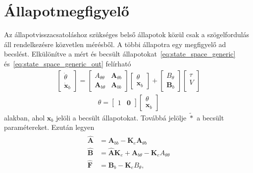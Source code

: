 \section{Állapotmegfigyelő}
Az állapotvisszacsatoláshoz szükséges belső állapotok közül csak a szögelfordulás
áll rendelkezésre közvetlen mérésből. A többi állapotra egy megfigyelő ad becslést.
Elkülönítve a mért és becsült állapotokat~\eqref{eq:state_space_generic} és~\eqref{eq:state_space_generic_out} felírható
\begin{align}
    \begin{bmatrix}
        \dot\theta \\
        \dot{\bm x}_b
    \end{bmatrix}
    =
    \begin{bmatrix}
        A_{\theta\theta} & \bm A_{\theta b} \\
        \bm A_{b \theta} & \bm A_{bb}
    \end{bmatrix}
    \begin{bmatrix}
        \theta \\
        \bm x_b
    \end{bmatrix}
    +
    \begin{bmatrix}
        B_\theta \\
        \bm B_b
    \end{bmatrix}
    \begin{bmatrix}
        \tau \\
        V \\
    \end{bmatrix}
\end{align}
\begin{align}\label{eq:observer_out}
    \theta = 
    \begin{bmatrix}
        1 & \bm 0
    \end{bmatrix}
    \begin{bmatrix}
        \theta \\
        \bm x_b
    \end{bmatrix}
\end{align}
alakban, ahol $\bm{x}_b$ jelöli a becsült állapotokat. Továbbá jelölje $\tilde{*}$ 
a becsült paramétereket. Ezután legyen
\begin{align}
    \begin{split}
    \hat{\bm A} &= \bm A_{bb} - \bm K_e \bm A_{\theta b} \\
    \hat{\bm B} &= \hat{\bm A} \bm K_e + \bm A_{b \theta} - \bm K_e A_{\theta \theta} \\
    \hat{\bm F} &= \bm B_b - \bm K_e B_\theta,
    \end{split}
\end{align}
